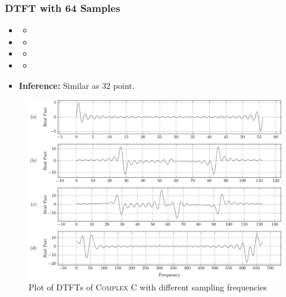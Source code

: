 \documentclass[../../course]{subfiles}
\begin{document}
\subsubsection{DTFT with 64 Samples}

\begin{itemize} [label=]

    \item \sampFreqMuchLess
        \begin{itemize} [label=]
            \item
        \end{itemize}

    \item \sampFreqNorm
        \begin{itemize} [label=]
            \item
        \end{itemize}

    \item \sampFreqSligGreat
        \begin{itemize} [label=]
            \item
        \end{itemize}

    \item \sampFreqMuchGreat
        \begin{itemize} [label=]
            \item
        \end{itemize}

    \item \textbf{Inference:} Similar as $32$ point.

\end{itemize}


\vfill

\begin{figure} [H]
    \centering
     {
        \includegraphics[height = 0.8\textheight] {tikzpics/plotDtftComplexC64.pdf}
    }
     {Plot of \textsc{DTFT}s of \textsc{Complex C} with different sampling frequencies}
    \label{plt:dtftComplexC}
\end{figure}
\end{document}
